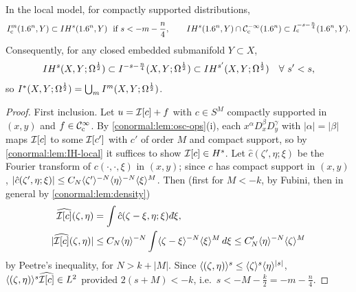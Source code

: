 \begin{theorem}\label{conormal:thm:IH}
  In the local model, for compactly supported distributions,
  \begin{equation}\label{conormal:eq:IH-incl}
    I^{m}_{\mathrm c}(1.6^n,Y)\subset IH^{s}(1.6^n,Y)\ \text{ if } s<-m-\frac n4,
    \qquad
    IH^{s}(1.6^n,Y)\cap\mathcal{C}^{-\infty}_{\mathrm{c}}(1.6^n)\subset I^{-s-\frac n4}_{\mathrm c}(1.6^n,Y).
  \end{equation}
  Consequently, for any closed embedded submanifold $Y\subset X$,
  \begin{equation*}
    IH^{s}(X,Y;\Omega^{\frac12})\subset I^{-s-\frac n4}(X,Y;\Omega^{\frac12})\subset
    IH^{s'}(X,Y;\Omega^{\frac12})\quad\forall\ s'<s,
  \end{equation*}
  so $I^{*}(X,Y;\Omega^{\frac12})=\bigcup_mI^{m}(X,Y;\Omega^{\frac12})$.
\end{theorem}
\begin{proof}
  First inclusion.  Let $u=\mathcal{I}[c]+f$ with $c\in S^M$ compactly supported in
  $(x,y)$ and $f\in\mathcal{C}^\infty_{\mathrm{c}}$.  By \cref{conormal:lem:osc-ops}(i), each
  $x^\alpha D_x^\beta D_y^\gamma$ with $|\alpha|=|\beta|$ maps $\mathcal{I}[c]$ to some
  $\mathcal{I}[c']$ with $c'$ of order $M$ and compact support, so by
  \cref{conormal:lem:IH-local} it suffices to show $\mathcal{I}[c]\in H^s$.  Let
  $\hat c(\zeta',\eta;\xi)$ be the Fourier transform of $c(\cdot,\cdot,\xi)$ in
  $(x,y)$; since $c$ has compact support in $(x,y)$,
  $|\hat c(\zeta',\eta;\xi)|\le C_N\langle \zeta'\rangle^{-N}\langle \eta\rangle^{-N}\langle \xi\rangle^{M}$.
  Then (first for $M<-k$, by Fubini, then in general by
  \cref{conormal:lem:density})
  \begin{align*}
    \widehat{\osc{c}}(\zeta,\eta)&=\int\hat c(\zeta-\xi,\eta;\xi)\,\dbar\xi,\\
    |\widehat{\osc{c}}(\zeta,\eta)|&\le C_N\ang\eta^{-N}\int
    \ang{\zeta-\xi}^{-N}\ang\xi^M\,d\xi\le C'_N\ang\eta^{-N}\ang\zeta^M
  \end{align*}
  by Peetre's inequality, for $N>k+|M|$.  Since
  $\langle (\zeta,\eta)\rangle^{s}\le\langle \zeta\rangle^s\langle \eta\rangle^{|s|}$,
  $\langle (\zeta,\eta)\rangle^s\widehat{\mathcal{I}[c]}\in L^2$ provided $2(s+M)<-k$, i.e.\
  $s<-M-\frac k2=-m-\frac n4$.


\end{proof}
